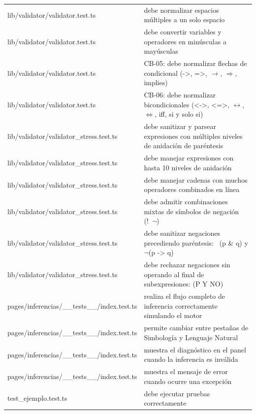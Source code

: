 \documentclass[11pt,a4paper,openany]{book}
\begin{document}
\begin{center}
\begin{longtable}{ll}
lib/validator/validator.test.ts & debe normalizar espacios múltiples a un solo espacio \\
lib/validator/validator.test.ts & debe convertir variables y operadores en minúsculas a mayúsculas \\
lib/validator/validator.test.ts & CB-05: debe normalizar flechas de condicional (->, =>, $ \to $, $ \Rightarrow $, implies) \\
lib/validator/validator.test.ts & CB-06: debe normalizar bicondicionales (<->, <=>, $ \leftrightarrow $, $ \Leftrightarrow $, iff, si y solo si) \\
lib/validator/validator\_stress.test.ts & debe sanitizar y parsear expresiones con múltiples niveles de anidación de paréntesis \\
lib/validator/validator\_stress.test.ts & debe manejar expresiones con hasta 10 niveles de anidación \\
lib/validator/validator\_stress.test.ts & debe manejar cadenas con muchos operadores combinados en línea \\
lib/validator/validator\_stress.test.ts & debe admitir combinaciones mixtas de símbolos de negación (!~$ \lnot $) \\
lib/validator/validator\_stress.test.ts & debe sanitizar negaciones precediendo paréntesis: ~(p \& q) y $ \lnot $(p -> q) \\
lib/validator/validator\_stress.test.ts & debe rechazar negaciones sin operando al final de subexpresiones: (P Y NO) \\
pages/inferencias/\_\_tests\_\_/index.test.ts & realiza el flujo completo de inferencia correctamente simulando el motor \\
pages/inferencias/\_\_tests\_\_/index.test.ts & permite cambiar entre pestañas de Simbología y Lenguaje Natural \\
pages/inferencias/\_\_tests\_\_/index.test.ts & muestra el diagnóstico en el panel cuando la inferencia es inválida \\
pages/inferencias/\_\_tests\_\_/index.test.ts & muestra el mensaje de error cuando ocurre una excepción \\
test\_ejemplo.test.ts & debe ejecutar pruebas correctamente \\
\bottomrule
\end{longtable}
\end{center}
\end{document}
